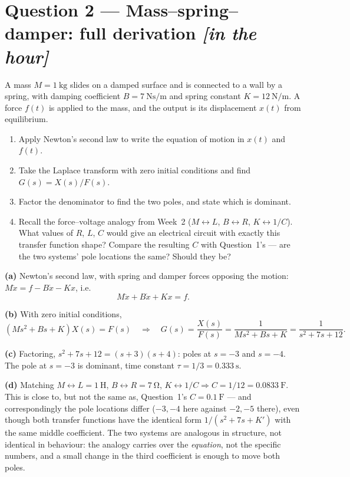 \documentclass[11pt,a4paper]{article}
\newcommand{\inhour}{\hfill{\small\color{faccent}\itshape[in the hour]}}
\begin{document}
\section*{Question 2 --- Mass--spring--damper: full derivation \inhour}

A mass $M=\SI{1}{\kilogram}$ slides on a damped surface and is connected to a
wall by a spring, with damping coefficient $B=\SI{7}{\newton\second\per\metre}$
and spring constant $K=\SI{12}{\newton\per\metre}$. A force $f(t)$ is applied
to the mass, and the output is its displacement $x(t)$ from equilibrium.

\begin{enumerate}[label=(\alph*)]
\item Apply Newton's second law to write the equation of motion in $x(t)$
      and $f(t)$.
\item Take the Laplace transform with zero initial conditions and find
      $G(s)=X(s)/F(s)$.
\item Factor the denominator to find the two poles, and state which is
      dominant.
\item Recall the force--voltage analogy from Week~2 ($M\!\leftrightarrow\! L$,
      $B\!\leftrightarrow\! R$, $K\!\leftrightarrow\! 1/C$). What values of
      $R$, $L$, $C$ would give an electrical circuit with exactly this
      transfer function shape? Compare the resulting $C$ with Question~1's
      --- are the two systems' pole locations the same? Should they be?
\end{enumerate}

\begin{solution}
\textbf{(a)} Newton's second law, with spring and damper forces opposing the
motion: $M\ddot x = f - B\dot x - Kx$, i.e.
\[
  M\ddot x + B\dot x + Kx = f .
\]

\medskip
\textbf{(b)} With zero initial conditions,
\[
  (Ms^2+Bs+K)X(s)=F(s)
  \quad\Longrightarrow\quad
  G(s)=\frac{X(s)}{F(s)}=\frac{1}{Ms^2+Bs+K}
  =\frac{1}{s^2+7s+12}.
\]

\medskip
\textbf{(c)} Factoring, $s^2+7s+12=(s+3)(s+4)$: poles at $s=-3$ and $s=-4$.
The pole at $s=-3$ is dominant, time constant $\tau=1/3=\SI{0.333}{\second}$.

\medskip
\textbf{(d)} Matching $M\leftrightarrow L=\SI{1}{\henry}$,
$B\leftrightarrow R=\SI{7}{\ohm}$, $K\leftrightarrow 1/C\Rightarrow
C=1/12=\SI{0.0833}{\farad}$. This is close to, but not the same as,
Question~1's $C=\SI{0.1}{\farad}$ --- and correspondingly the pole locations
differ ($-3,-4$ here against $-2,-5$ there), even though both transfer
functions have the identical form $1/(s^2+7s+K')$ with the same middle
coefficient. The two systems are analogous in structure, not identical in
behaviour: the analogy carries over the \emph{equation}, not the specific
numbers, and a small change in the third coefficient is enough to move both
poles.
\end{solution}
\end{document}
